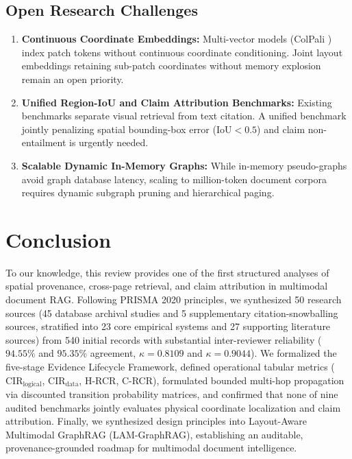 \documentclass[conference,a4paper]{IEEEtran}
\begin{document}
\subsection{Open Research Challenges}
\begin{enumerate}
    \item \textbf{Continuous Coordinate Embeddings:} Multi-vector models (ColPali \cite{faysse2025colpali}) index patch tokens without continuous coordinate conditioning. Joint layout embeddings retaining sub-patch coordinates without memory explosion remain an open priority.
    \item \textbf{Unified Region-IoU and Claim Attribution Benchmarks:} Existing benchmarks separate visual retrieval from text citation. A unified benchmark jointly penalizing spatial bounding-box error ($\text{IoU} < 0.5$) and claim non-entailment is urgently needed.
    \item \textbf{Scalable Dynamic In-Memory Graphs:} While in-memory pseudo-graphs \cite{niu2026} avoid graph database latency, scaling to million-token document corpora requires dynamic subgraph pruning and hierarchical paging.
\end{enumerate}

\section{Conclusion}
To our knowledge, this review provides one of the first structured analyses of spatial provenance, cross-page retrieval, and claim attribution in multimodal document RAG. Following PRISMA 2020 principles, we synthesized 50 research sources (45 database archival studies and 5 supplementary citation-snowballing sources, stratified into 23 core empirical systems and 27 supporting literature sources) from 540 initial records with substantial inter-reviewer reliability ($94.55\%$ and $95.35\%$ agreement, $\kappa = 0.8109$ and $\kappa = 0.9044$). We formalized the five-stage Evidence Lifecycle Framework, defined operational tabular metrics ($\text{CIR}_{\text{logical}}$, $\text{CIR}_{\text{data}}$, H-RCR, C-RCR), formulated bounded multi-hop propagation via discounted transition probability matrices, and confirmed that none of nine audited benchmarks jointly evaluates physical coordinate localization and claim attribution. Finally, we synthesized design principles into Layout-Aware Multimodal GraphRAG (LAM-GraphRAG), establishing an auditable, provenance-grounded roadmap for multimodal document intelligence.
\end{document}
